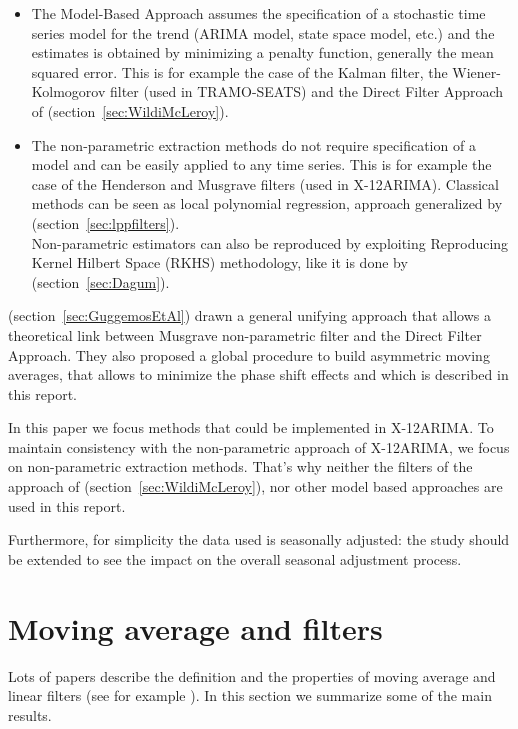 \documentclass[
  12pt,
  ,
  a4paper]{article}
\newcommand\1{\mathds{1}}
\begin{document}
\begin{itemize}
\item
  The Model-Based Approach assumes the specification of a stochastic time series model for the trend (ARIMA model, state space model, etc.) and the estimates is obtained by minimizing a penalty function, generally the mean squared error.
  This is for example the case of the Kalman filter, the Wiener-Kolmogorov filter (used in TRAMO-SEATS) and the Direct Filter Approach of \textcite{trilemmaWMR2019} (section~\ref{sec:WildiMcLeroy}).
\item
  The non-parametric extraction methods do not require specification of a model and can be easily applied to any time series.
  This is for example the case of the Henderson and Musgrave filters (used in X-12ARIMA).
  Classical methods can be seen as local polynomial regression, approach generalized by \textcite{proietti2008} (section~\ref{sec:lppfilters}).\\
  Non-parametric estimators can also be reproduced by exploiting Reproducing Kernel Hilbert Space (RKHS) methodology, like it is done by
  \textcite{dagumbianconcini2008} (section~\ref{sec:Dagum}).
\end{itemize}

\textcite{ch15HBSA} (section~\ref{sec:GuggemosEtAl}) drawn a general unifying approach that allows a theoretical link between Musgrave non-parametric filter and the Direct Filter Approach.
They also proposed a global procedure to build asymmetric moving averages, that allows to minimize the phase shift effects and which is described in this report.

In this paper we focus methods that could be implemented in X-12ARIMA.
To maintain consistency with the non-parametric approach of X-12ARIMA, we focus on non-parametric extraction methods.
That's why neither the filters of the approach of \textcite{trilemmaWMR2019} (section~\ref{sec:WildiMcLeroy}), nor other model based approaches are used in this report.

Furthermore, for simplicity the data used is seasonally adjusted: the study should be extended to see the impact on the overall seasonal adjustment process.

\hypertarget{sec:propMM}{%
\section{Moving average and filters}\label{sec:propMM}}

Lots of papers describe the definition and the properties of moving average and linear filters (see for example \textcite{ch12HBSA}).
In this section we summarize some of the main results.
\end{document}
